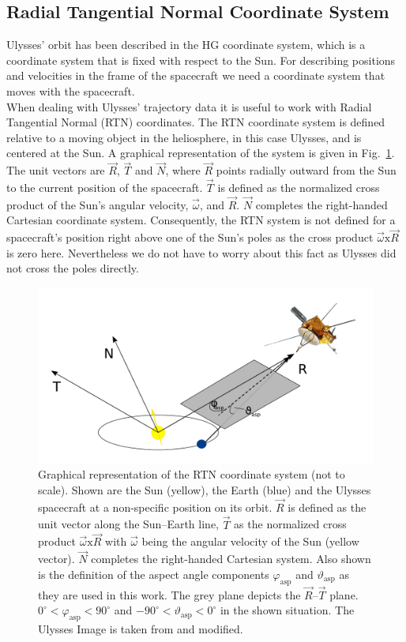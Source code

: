 \subsection{Radial Tangential Normal Coordinate System}
Ulysses' orbit has been described in the HG coordinate system, which is a coordinate system that is fixed with respect to the Sun. For describing positions and velocities in the frame of the spacecraft we need a coordinate system that moves with the spacecraft.
\\
When dealing with Ulysses' trajectory data it is useful to work with Radial Tangential Normal (RTN) coordinates. The RTN coordinate system is defined relative to a moving object in the heliosphere, in this case Ulysses, and is centered at the Sun. A graphical representation of the system is given in Fig.~\ref{fig:rtn}. The unit vectors are $\vec{R}$, $\vec{T}$ and $\vec{N}$, where $\vec{R}$ points radially outward from the Sun to the current position of the spacecraft. $\vec{T}$ is defined as the normalized cross product of the Sun's angular velocity, $\vec{\omega}$, and $\vec{R}$. $\vec{N}$ completes the right-handed Cartesian coordinate system. Consequently, the RTN system is not defined for a spacecraft's position right above one of the Sun's poles as the cross product $\vec{\omega} \mathrm{x} \vec{R}$ is zero here. Nevertheless we do not have to worry about this fact as Ulysses did not cross the poles directly.
%
%
\begin{figure}[h]
	\includegraphics[width=1\textwidth]{Figures/drawing_RTN.pdf}
	\centering
	\caption{Graphical representation of the RTN coordinate system (not to scale). Shown are the Sun (yellow), the Earth (blue) and the Ulysses spacecraft at a non-specific position on its orbit. $\vec{R}$ is defined as the unit vector along the Sun--Earth line, $\vec{T}$ as the normalized cross product $\vec{\omega} \mathrm{x} \vec{R}$ with $\vec{\omega}$ being the angular velocity of the Sun (yellow vector). $\vec{N}$ completes the right-handed Cartesian system. Also shown is the definition of the aspect angle components $\varphi_{\mathrm{asp}}$ and $\vartheta_{\mathrm{asp}}$ as they are used in this work. The grey plane depicts the $\vec{R}$--$\vec{T}$ plane. $0 ^\circ < \varphi_{\mathrm{asp}} < 90^\circ$ and $-90 ^\circ < \vartheta_{\mathrm{asp}} < 0^\circ$ in the shown situation. The Ulysses Image is taken from \cite{esa_orbit} and modified.}
	\label{fig:rtn}
\end{figure}
%
%
%

